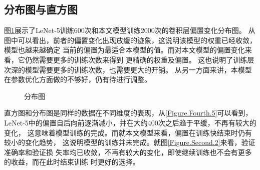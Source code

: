   \subsection{\hei\xiaosan\textbf{分布图与直方图}}
    图\ref{Figure.Fourth.4}展示了LeNet-5训练600次和本文模型训练2000次的卷积层偏置变化分布图。
    从图中可以看出，前者的偏置变化出现放缓的迹象，这说明该模型的权重已经收敛，模型也越来越确定
    当前的偏置为最适合本模型的值。而对本文模型的偏置变化来看，它仍然需要更多的训练次数来得到
    更精确的权重及偏置。
    这也说明了训练层次深的模型需要更多的训练次数，也需要更大的开销。
    从另一方面来讲，本模型在参数优化方面做的不够好，仍有待进行调整。

    \begin{figure}[H]
      \centering
      \caption{分布图}
      \label{Figure.Fourth.4}
    \end{figure}
    
    直方图和分布图是同样的数据在不同维度的表现，从\ref{Figure.Fourth.5}可以看到，
    LeNet-5中的偏置自后向前逐渐减小，并在大约400次之后趋于平缓，不再有较大的变化，
    这意味着模型训练的完成。而就本文模型来看，偏置在训练快结束时仍有较小的变化趋势，
    这说明模型的训练并未完成。就图\ref{Figure.Second.2}来看，验证准确率和验证损
    失率均已收敛，不再有较大的变化，即使继续训练也不会有更多的收益，而在此时结束训练
    时更好的选择。

